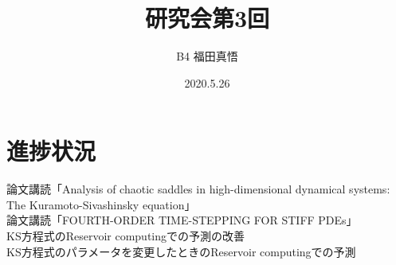 \documentclass[autodetect-engine,dvipdfmx-if-dvi,ja=standard,a4paper,11pt]{bxjsarticle} %
\title{研究会第3回} %
\author{B4 福田真悟} %
\date{2020.5.26}%
\begin{document}
\maketitle %
\section{進捗状況}%
論文講読「Analysis of chaotic saddles in high-dimensional dynamical systems: The Kuramoto-Sivashinsky
equation」\cite{all1}\\
論文講読「FOURTH-ORDER TIME-STEPPING FOR STIFF PDEs」\cite{all2}\\
\　KS方程式のReservoir computingでの予測の改善\\
\　KS方程式のパラメータを変更したときのReservoir computingでの予測
\end{document}
